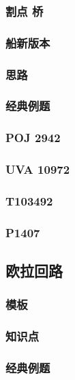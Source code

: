 \documentclass[10pt,a4paper]{article}
\begin{document}
\subsubsection{割点 桥}

\subsubsection{船新版本}

\subsubsection{思路}

\subsubsection{经典例题}

\subsubsection{POJ 2942}

\subsubsection{UVA 10972}

\subsubsection{T103492}

\subsubsection{P1407}

\subsection{欧拉回路}
\subsubsection{模板}

\subsubsection{知识点}

\subsubsection{经典例题}

\end{document}
